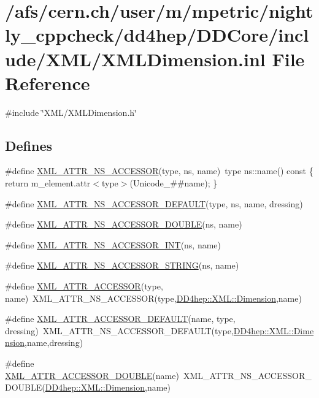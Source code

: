 \hypertarget{_x_m_l_dimension_8inl}{
\section{/afs/cern.ch/user/m/mpetric/nightly\_\-cppcheck/dd4hep/DDCore/include/XML/XMLDimension.inl File Reference}
\label{_x_m_l_dimension_8inl}
}
{\ttfamily \#include \char`\"{}XML/XMLDimension.h\char`\"{}}\par
\subsection*{Defines}
\begin{DoxyCompactItemize}
\item 
\#define \hyperlink{_x_m_l_dimension_8inl_a712f343791889ac7912b917b64ccb32a}{XML\_\-ATTR\_\-NS\_\-ACCESSOR}(type, ns, name)~type ns::name() const \{ return m\_\-element.attr$<$type$>$(Unicode\_\-\#\#name); \}
\item 
\#define \hyperlink{_x_m_l_dimension_8inl_a621d9cfc07f37e663ecb8f6c5bd22dfa}{XML\_\-ATTR\_\-NS\_\-ACCESSOR\_\-DEFAULT}(type, ns, name, dressing)
\item 
\#define \hyperlink{_x_m_l_dimension_8inl_a41ecea5c5f5c5ebc82e772c4dea4c97c}{XML\_\-ATTR\_\-NS\_\-ACCESSOR\_\-DOUBLE}(ns, name)
\item 
\#define \hyperlink{_x_m_l_dimension_8inl_ad521d34a53e9f1ab96da2b2566438d95}{XML\_\-ATTR\_\-NS\_\-ACCESSOR\_\-INT}(ns, name)
\item 
\#define \hyperlink{_x_m_l_dimension_8inl_acd82de7a6fdd451bdc3f3d7665c66899}{XML\_\-ATTR\_\-NS\_\-ACCESSOR\_\-STRING}(ns, name)
\item 
\#define \hyperlink{_x_m_l_dimension_8inl_accabcb0a0a37bcff066b1281c9814553}{XML\_\-ATTR\_\-ACCESSOR}(type, name)~XML\_\-ATTR\_\-NS\_\-ACCESSOR(type,\hyperlink{struct_d_d4hep_1_1_x_m_l_1_1_dimension}{DD4hep::XML::Dimension},name)
\item 
\#define \hyperlink{_x_m_l_dimension_8inl_a5329c32158716b05939bad5ab5e572df}{XML\_\-ATTR\_\-ACCESSOR\_\-DEFAULT}(name, type, dressing)~XML\_\-ATTR\_\-NS\_\-ACCESSOR\_\-DEFAULT(type,\hyperlink{struct_d_d4hep_1_1_x_m_l_1_1_dimension}{DD4hep::XML::Dimension},name,dressing)
\item 
\#define \hyperlink{_x_m_l_dimension_8inl_a3b2602f2e6cdf903b4d9acd047d61b12}{XML\_\-ATTR\_\-ACCESSOR\_\-DOUBLE}(name)~XML\_\-ATTR\_\-NS\_\-ACCESSOR\_\-DOUBLE(\hyperlink{struct_d_d4hep_1_1_x_m_l_1_1_dimension}{DD4hep::XML::Dimension},name)

\end{DoxyCompactItemize}
